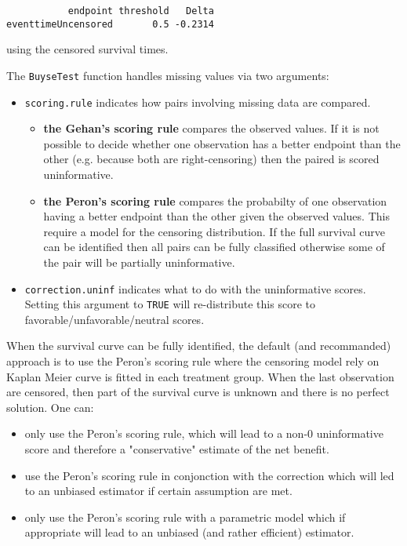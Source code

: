 \documentclass[12pt]{article}
\begin{document}
\begin{verbatim}
           endpoint threshold   Delta
eventtimeUncensored       0.5 -0.2314
\end{verbatim}

using the censored survival times.

\clearpage

The \texttt{BuyseTest} function handles missing values via two arguments:
\begin{itemize}
\item \texttt{scoring.rule} indicates how pairs involving missing data are compared. 
\begin{itemize}
\item \textbf{the Gehan's scoring rule} compares the observed values. If it is
not possible to decide whether one observation has a better
endpoint than the other (e.g. because both are right-censoring)
then the paired is scored uninformative.
\item \textbf{the Peron's scoring rule} compares the probabilty of one
observation having a better endpoint than the other given the
observed values. This require a model for the censoring
distribution. If the full survival curve can be identified then
all pairs can be fully classified otherwise some of the pair
will be partially uninformative.
\end{itemize}
\item \texttt{correction.uninf} indicates what to do with the uninformative
scores. Setting this argument to \texttt{TRUE} will re-distribute this
score to favorable/unfavorable/neutral scores.
\end{itemize}

When the survival curve can be fully identified, the default (and
recommanded) approach is to use the Peron's scoring rule where the
censoring model rely on Kaplan Meier curve is fitted in each treatment
group. \newline When the last observation are censored, then part of
the survival curve is unknown and there is no perfect solution. One can:
\begin{itemize}
\item only use the Peron's scoring rule, which will lead to a non-0
uninformative score and therefore a "conservative" estimate of the net benefit.
\item use the Peron's scoring rule in conjonction with the correction
which will led to an unbiased estimator if certain assumption are met.
\item only use the Peron's scoring rule with a parametric model which if
appropriate will lead to an unbiased (and rather efficient)
estimator.
\end{itemize}
\end{document}
